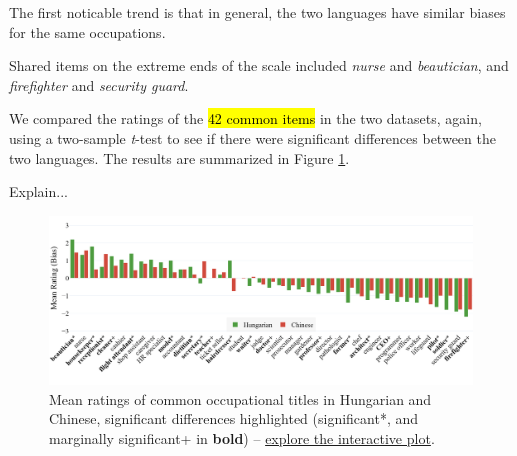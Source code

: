 \documentclass[11pt]{article}
\begin{document}
The first noticable trend is that in general, the two languages have similar biases for the same occupations. 

Shared items on the extreme ends of the scale included \textit{nurse} and \textit{beautician}, and \textit{firefighter} and \textit{security guard}.



We compared the ratings of the \hl{42 common items} in the two datasets, again, using a two-sample \textit{t}-test to see if there were significant differences between the two languages. The results are summarized in Figure \ref{fig:occupations_comparison}. 

Explain...

\begin{figure}[ht]
  \centering
  \includegraphics[width=\linewidth]{../occupations_comparison}
  \caption{Mean ratings of common occupational titles in Hungarian and Chinese, significant differences highlighted (significant*, and marginally significant+ in \textbf{bold}) -- \href{https://htmlpreview.github.io/?https://github.com/partigabor/occupational-bias/blob/main/occupations_comparison.html}{explore the interactive plot}.}
  \label{fig:occupations_comparison}
\end{figure}




\end{document}
